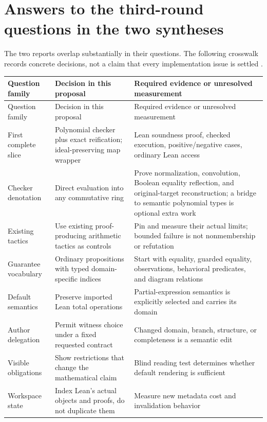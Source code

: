\documentclass[11pt,a4paper]{article}
\theoremstyle{plain}
\theoremstyle{definition}
\theoremstyle{remark}
\begin{document}
\clearpage
\appendix
\section{Answers to the third-round questions in the two syntheses}
\label{app:questions}
The two reports overlap substantially in their questions. The following
crosswalk records concrete decisions, not a claim that every implementation
issue is settled \cite{synthesis,workbenches}.

{\small
\begin{longtable}{@{}P{29mm}P{45mm}P{71mm}@{}}
\toprule
Question family & Decision in this proposal & Required evidence or unresolved measurement\\
\midrule\endfirsthead
\toprule Question family & Decision in this proposal & Required evidence or unresolved measurement\\\midrule\endhead
\bottomrule\endfoot
First complete slice & Polynomial checker plus exact reification; ideal-preserving map wrapper & Lean soundness proof, checked execution, positive/negative cases, ordinary Lean access\\
Checker denotation & Direct evaluation into any commutative ring & Prove normalization, convolution, Boolean equality reflection, and original-target reconstruction; a bridge to semantic polynomial types is optional extra work\\
Existing tactics & Use existing proof-producing arithmetic tactics as controls & Pin and measure their actual limits; bounded failure is not nonmembership or refutation\\
Guarantee vocabulary & Ordinary propositions with typed domain-specific indices & Start with equality, guarded equality, observations, behavioral predicates, and diagram relations\\
Default semantics & Preserve imported Lean total operations & Partial-expression semantics is explicitly selected and carries its domain\\
Author delegation & Permit witness choice under a fixed requested contract & Changed domain, branch, structure, or completeness is a semantic edit\\
Visible obligations & Show restrictions that change the mathematical claim & Blind reading test determines whether default rendering is sufficient\\
Workspace state & Index Lean's actual objects and proofs, do not duplicate them & Measure new metadata cost and invalidation behavior\\

\end{longtable}}
\end{document}
